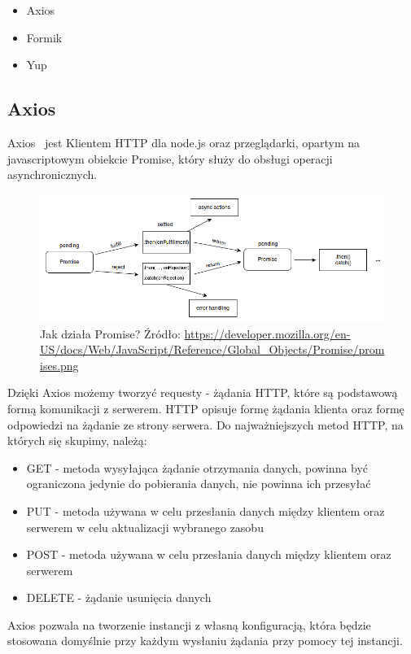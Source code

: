 \documentclass[oneside,polski,logo,indent]{amuthesis}
\begin{document}
\begin{itemize}
\item Axios
\item Formik
\item Yup
\end{itemize}

\subsection{Axios}
Axios~\cite{axios} jest Klientem HTTP dla node.js oraz przeglądarki, opartym na javascriptowym obiekcie Promise, który służy do obsługi operacji asynchronicznych.

\begin{figure}[H]
\centering
\includegraphics[width=13cm]{promises.png}
\caption{Jak działa Promise?
\newline
Źródło: \url{https://developer.mozilla.org/en-US/docs/Web/JavaScript/Reference/Global_Objects/Promise/promises.png}
}
\label{react dev example.jpg}
\end{figure}

Dzięki Axios możemy tworzyć requesty - żądania HTTP, które są podstawową formą komunikacji z serwerem. HTTP opisuje formę żądania klienta oraz formę odpowiedzi na żądanie ze strony serwera. Do najważniejszych metod HTTP, na których się skupimy, należą:

\begin{itemize}
\item GET - metoda wysyłająca żądanie otrzymania danych, powinna być ograniczona jedynie do pobierania danych, nie powinna ich przesyłać
\item PUT - metoda używana w celu przesłania danych między klientem  oraz serwerem w celu aktualizacji wybranego zasobu
\item POST - metoda używana w celu przesłania danych między klientem  oraz serwerem
\item DELETE - żądanie usunięcia danych
\end{itemize}

Axios pozwala na tworzenie instancji z własną konfiguracją, która będzie stosowana domyślnie przy każdym wysłaniu żądania przy pomocy
tej instancji.
\end{document}
